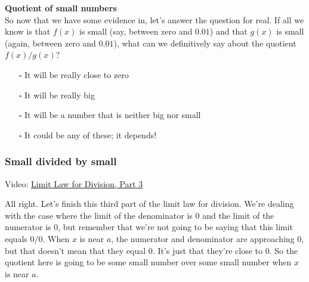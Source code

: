 \documentclass[pdftex, brazil, 12pt, twoside]{article}
\begin{document}
\begin{exercise}
  \textbf{Quotient of small numbers}\\
  So now that we have some evidence in, let's answer the question for real.
  If all we know is that $f(x)$ is small (say, between zero and $0.01$) and that
  $g(x)$ is small (again, between zero and $0.01$), what can we definitively say
  about the quotient $f(x)/g(x)$? 
  \begin{itemize}[noitemsep]
  \item[$\square$] It will be really close to zero
  \item[$\square$] It will be really big
  \item[$\square$] It will be a number that is neither big nor small
  \item[$\square$] It could be any of these; it depends!
  \end{itemize}
\end{exercise}

\subsubsection{Small divided by small}
\label{u0-lim-quo-small-div-small}

Video: \href{https://www.youtube.com/watch?v=3VysBc12dOI}{Limit Law for Division, Part 3}

All right.
Let's finish this third part of the limit law for division.
We're dealing with the case where
the limit of the denominator is $0$
and the limit of the numerator is $0$, but remember
that we're not going to be saying that this limit equals
$0/0$.
When $x$ is near $a$, the numerator and denominator
are approaching $0$, but that doesn't mean that they equal $0$.
It's just that they're close to $0$.
So the quotient here is going to be
some small number over some small number when $x$ is near $a$.

\begin{figure}[H]
  \begin{center}
  \end{center}
\end{figure}
\end{document}
